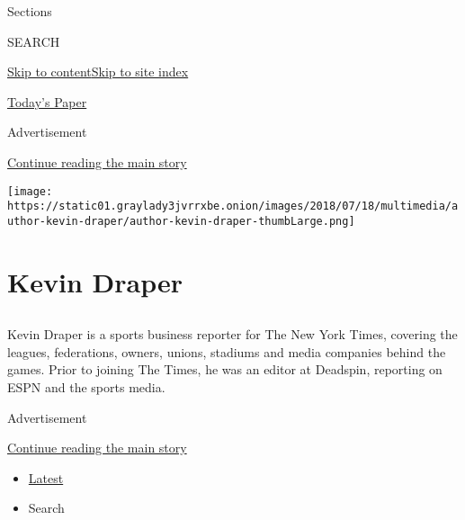 Sections

SEARCH

\protect\hyperlink{site-content}{Skip to
content}\protect\hyperlink{site-index}{Skip to site index}

\href{https://myaccount.nytimes3xbfgragh.onion/auth/login?response_type=cookie\&client_id=vi}{}

\href{https://www.nytimes3xbfgragh.onion/section/todayspaper}{Today's
Paper}

Advertisement

\protect\hyperlink{after-top}{Continue reading the main story}

\texttt{[image: https://static01.graylady3jvrrxbe.onion/images/2018/07/18/multimedia/author-kevin-draper/author-kevin-draper-thumbLarge.png]}

\hypertarget{kevin-draper}{%
\section{Kevin Draper}\label{kevin-draper}}

\subsection{}

Kevin Draper is a sports business reporter for The New York Times,
covering the leagues, federations, owners, unions, stadiums and media
companies behind the games. Prior to joining The Times, he was an editor
at Deadspin, reporting on ESPN and the sports media.~

Advertisement

\protect\hyperlink{after-mid1}{Continue reading the main story}

\begin{itemize}
\tightlist
\item
  \protect\hyperlink{stream-panel}{Latest}
\item
  Search
\end{itemize}

